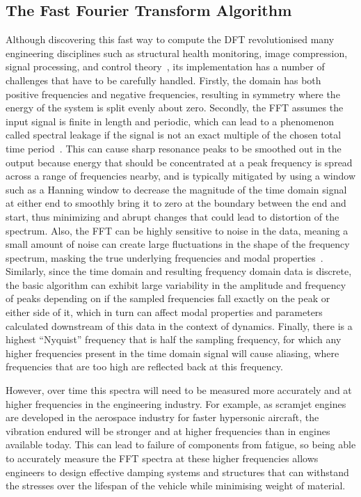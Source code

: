 \documentclass[12pt]{article}
\begin{document}
    \subsection{The Fast Fourier Transform Algorithm}
    Although discovering this fast way to compute the DFT revolutionised many engineering disciplines such as structural health monitoring, image compression, signal processing, and control theory~\cite{Byjus2023}, its implementation has a number of challenges that have to be carefully handled.
    Firstly, the domain has both positive frequencies and negative frequencies, resulting in symmetry where the energy of the system is split evenly about zero.
    Secondly, the FFT assumes the input signal is finite in length and periodic, which can lead to a phenomenon called spectral leakage if the signal is not an exact multiple of the chosen total time period~\cite{MathStackExchange2023}.
    This can cause sharp resonance peaks to be smoothed out in the output because energy that should be concentrated at a peak frequency is spread across a range of frequencies nearby, and is typically mitigated by using a window such as a Hanning window to decrease the magnitude of the time domain signal at either end to smoothly bring it to zero at the boundary between the end and start, thus minimizing and abrupt changes that could lead to distortion of the spectrum.
    Also, the FFT can be highly sensitive to noise in the data, meaning a small amount of noise can create large fluctuations in the shape of the frequency spectrum, masking the true underlying frequencies and modal properties~\cite{MathStackExchange2023}.
    Similarly, since the time domain and resulting frequency domain data is discrete, the basic algorithm can exhibit large variability in the amplitude and frequency of peaks depending on if the sampled frequencies fall exactly on the peak or either side of it, which in turn can affect modal properties and parameters calculated downstream of this data in the context of dynamics.
    Finally, there is a highest ``Nyquist'' frequency that is half the sampling frequency, for which any higher frequencies present in the time domain signal will cause aliasing, where frequencies that are too high are reflected back at this frequency.

    However, over time this spectra will need to be measured more accurately and at higher frequencies in the engineering industry.
    For example, as scramjet engines are developed in the aerospace industry for faster hypersonic aircraft, the vibration endured will be stronger and at higher frequencies than in engines available today.
    This can lead to failure of components from fatigue, so being able to accurately measure the FFT spectra at these higher frequencies allows engineers to design effective damping systems and structures that can withstand the stresses over the lifespan of the vehicle while minimising weight of material.
\end{document}
